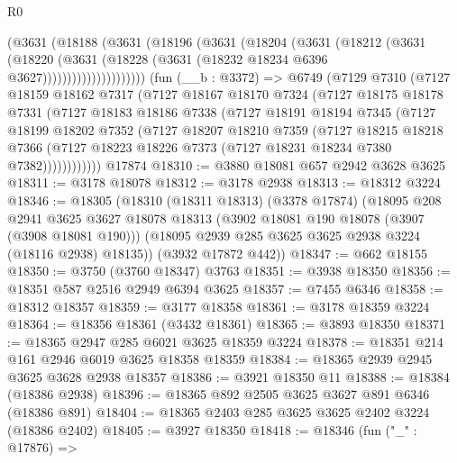 \begin{lexlean}{R0}
\begin{coremodule}
                  (@3631
                    (@18188
                      (@3631
                        (@18196
                          (@3631
                            (@18204
                              (@3631
                                (@18212
                                  (@3631
                                    (@18220
                                      (@3631
                                        (@18228
                                          (@3631 (@18232 @18234 @6396 @3627)))))))))))))))))))))
    (fun (__b : @3372) =>
    @6749
      (@7129
        @7310
        (@7127
          @18159
          @18162
          @7317
          (@7127
            @18167
            @18170
            @7324
            (@7127
              @18175
              @18178
              @7331
              (@7127
                @18183
                @18186
                @7338
                (@7127
                  @18191
                  @18194
                  @7345
                  (@7127
                    @18199
                    @18202
                    @7352
                    (@7127
                      @18207
                      @18210
                      @7359
                      (@7127
                        @18215
                        @18218
                        @7366
                        (@7127 @18223 @18226 @7373 (@7127 @18231 @18234 @7380 @7382))))))))))))
    @17874
@18310 := @3880 @18081 @657 @2942 @3628 @3625
@18311 := @3178 @18078
@18312 := @3178 @2938
@18313 := @18312 @3224
@18346 := @18305
    (@18310
      (@18311 @18313)
      (@3378 @17874)
      (@18095
        @208
        @2941
        @3625
        @3627
        @18078
        @18313
        (@3902 @18081 @190 @18078 (@3907 (@3908 @18081 @190)))
        (@18095 @2939 @285 @3625 @3625 @2938 @3224 (@18116 @2938) @18135))
      (@3932 @17872 @442))
@18347 := @662 @18155
@18350 := @3750 (@3760 @18347) @3763
@18351 := @3938 @18350
@18356 := @18351 @587 @2516 @2949 @6394 @3625
@18357 := @7455 @6346
@18358 := @18312 @18357
@18359 := @3177 @18358
@18361 := @3178 @18359 @3224
@18364 := @18356 @18361 (@3432 @18361)
@18365 := @3893 @18350
@18371 := @18365 @2947 @285 @6021 @3625 @18359 @3224
@18378 := @18351 @214 @161 @2946 @6019 @3625 @18358 @18359
@18384 := @18365 @2939 @2945 @3625 @3628 @2938 @18357
@18386 := @3921 @18350 @11
@18388 := @18384 (@18386 @2938)
@18396 := @18365 @892 @2505 @3625 @3627 @891 @6346 (@18386 @891)
@18404 := @18365 @2403 @285 @3625 @3625 @2402 @3224 (@18386 @2402)
@18405 := @3927 @18350
@18418 := @18346
    (fun ("_" : @17876) =>

\end{coremodule}
\end{lexlean}
